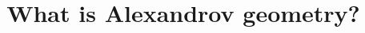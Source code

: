 \documentclass[twoside]{book}
\begin{document}
\frontmatter
\title{What is Alexandrov geometry?}
\maketitle








 
\end{document}
